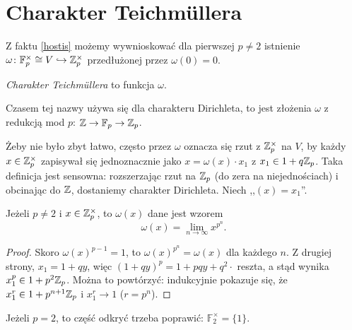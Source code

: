 \section{Charakter Teichmüllera\label{sekcjateich}}
Z faktu \ref{hostis} możemy wywnioskować dla pierwszej $p \neq 2$ istnienie $\omega \colon \mathbb F_p^\times \cong V \hookrightarrow \mathbb Z_p^\times$ przedłużonej przez $\omega(0) = 0$.

\begin{definicja}
	\emph{Charakter Teichmüllera} to funkcja $\omega$.
\end{definicja}

Czasem tej nazwy używa się dla charakteru Dirichleta, to jest złożenia $\omega$ z redukcją mod $p$: $\mathbb Z \to \mathbb F_p \to \mathbb Z_p$.

Żeby nie było zbyt łatwo, często przez $\omega$ oznacza się rzut z $\mathbb Z_p^\times$ na $V$, by każdy $x\in \mathbb Z_p^\times$ zapisywał się jednoznacznie jako $x = \omega(x) \cdot x_1$ z $x_1 \in 1 + q\mathbb Z_p$.
Taka definicja jest sensowna: rozszerzając rzut na $\mathbb Z_p$ (do zera na niejednościach) i obcinając do $\mathbb Z$, dostaniemy charakter Dirichleta.
Niech ,,$(x) = x_1$''.

\begin{fakt}
	Jeżeli $p \neq 2$ i $x \in \mathbb Z_p^\times$, to $\omega(x)$ dane jest wzorem
	\[
		\omega(x) = \lim_{n \to \infty} x^{p^n}.
	\]
\end{fakt}

\begin{proof}
	Skoro $\omega(x)^{p-1} = 1$, to $\omega(x)^{p^n} = \omega(x)$ dla każdego $n$.
	Z drugiej strony, $x_1 = 1 + qy$, więc $(1 + qy)^p = 1 + pqy + q^2 \cdot$ reszta, a stąd wynika $x_1^p \in 1 + p^2 \mathbb Z_p$.
	Można to powtórzyć: indukcyjnie pokazuje się, że $x_1^{r} \in 1 + p^{n+1} \mathbb Z_p$ i $x_1^r \to 1$ ($r = p^n$).
\end{proof}

Jeżeli $p = 2$, to część odkryć trzeba poprawić: $\mathbb F_2^\times = \{1\}$.